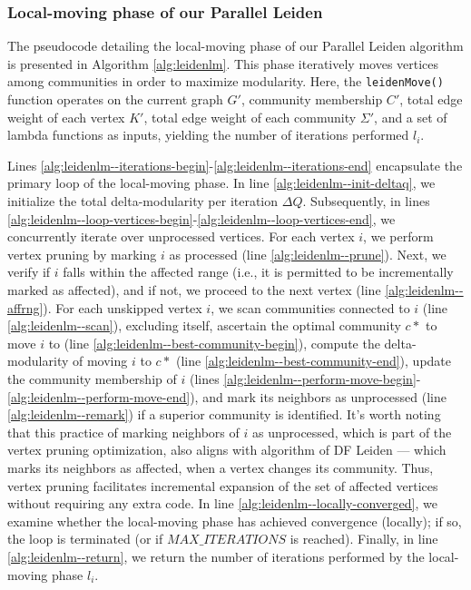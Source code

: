 \subsubsection{Local-moving phase of our Parallel Leiden}

The pseudocode detailing the local-moving phase of our Parallel Leiden algorithm is presented in Algorithm \ref{alg:leidenlm}. This phase iteratively moves vertices among communities in order to maximize modularity. Here, the \texttt{leidenMove()} function operates on the current graph $G'$, community membership $C'$, total edge weight of each vertex $K'$, total edge weight of each community $\Sigma'$, and a set of lambda functions as inputs, yielding the number of iterations performed $l_i$.



Lines \ref{alg:leidenlm--iterations-begin}-\ref{alg:leidenlm--iterations-end} encapsulate the primary loop of the local-moving phase. In line \ref{alg:leidenlm--init-deltaq}, we initialize the total delta-modularity per iteration $\Delta Q$. Subsequently, in lines \ref{alg:leidenlm--loop-vertices-begin}-\ref{alg:leidenlm--loop-vertices-end}, we concurrently iterate over unprocessed vertices. For each vertex $i$, we perform vertex pruning by marking $i$ as processed (line \ref{alg:leidenlm--prune}). Next, we verify if $i$ falls within the affected range (i.e., it is permitted to be incrementally marked as affected), and if not, we proceed to the next vertex (line \ref{alg:leidenlm--affrng}). For each unskipped vertex $i$, we scan communities connected to $i$ (line \ref{alg:leidenlm--scan}), excluding itself, ascertain the optimal community $c*$ to move $i$ to (line \ref{alg:leidenlm--best-community-begin}), compute the delta-modularity of moving $i$ to $c*$ (line \ref{alg:leidenlm--best-community-end}), update the community membership of $i$ (lines \ref{alg:leidenlm--perform-move-begin}-\ref{alg:leidenlm--perform-move-end}), and mark its neighbors as unprocessed (line \ref{alg:leidenlm--remark}) if a superior community is identified. It's worth noting that this practice of marking neighbors of $i$ as unprocessed, which is part of the vertex pruning optimization, also aligns with algorithm of DF Leiden --- which marks its neighbors as affected, when a vertex changes its community. Thus, vertex pruning facilitates incremental expansion of the set of affected vertices without requiring any extra code. In line \ref{alg:leidenlm--locally-converged}, we examine whether the local-moving phase has achieved convergence (locally); if so, the loop is terminated (or if $MAX\_ITERATIONS$ is reached). Finally, in line \ref{alg:leidenlm--return}, we return the number of iterations performed by the local-moving phase $l_i$.


